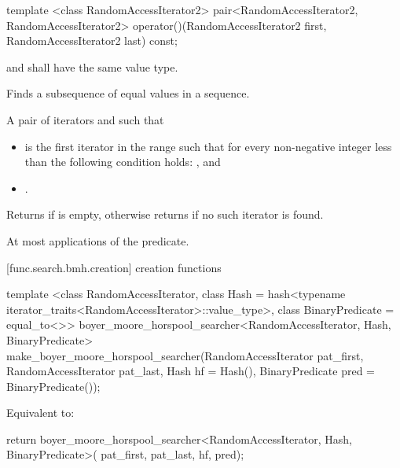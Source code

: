 %
\begin{itemdecl}
template <class RandomAccessIterator2>
  pair<RandomAccessIterator2, RandomAccessIterator2>
    operator()(RandomAccessIterator2 first, RandomAccessIterator2 last) const;
\end{itemdecl}

\begin{itemdescr}
\pnum
\requires
{} and  shall have the same value type.

\pnum
\effects
Finds a subsequence of equal values in a sequence.

\pnum
\returns
A pair of iterators  and  such that
\begin{itemize}
\item {} is the first iterator  in the range
 such that
for every non-negative integer  less than 
the following condition holds:
, and
\item {}.
\end{itemize}
Returns  if  is empty,
otherwise returns  if no such iterator is found.

\pnum
\complexity
At most  applications of the predicate.
\end{itemdescr}

[func.search.bmh.creation]{ creation functions}

%
\begin{itemdecl}
template <class RandomAccessIterator,
          class Hash = hash<typename iterator_traits<RandomAccessIterator>::value_type>,
          class BinaryPredicate = equal_to<>>
  boyer_moore_horspool_searcher<RandomAccessIterator, Hash, BinaryPredicate>
    make_boyer_moore_horspool_searcher(RandomAccessIterator pat_first,
                                       RandomAccessIterator pat_last,
                                       Hash hf = Hash(),
                                       BinaryPredicate pred = BinaryPredicate());
\end{itemdecl}

\begin{itemdescr}
\pnum
\effects
Equivalent to:
\begin{codeblock}
return boyer_moore_horspool_searcher<RandomAccessIterator, Hash, BinaryPredicate>(
    pat_first, pat_last, hf, pred);
\end{codeblock}
\end{itemdescr}

